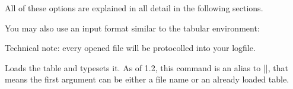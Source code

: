 \documentclass[a4paper]{ltxdoc}
\begin{document}
\begin{command}{\pgfplotstabletypeset{}}
    \noindent All of these options are explained in all detail in the following
    sections.

    You may also use an input format similar to the tabular environment:
\begin{codeexample}[width=8cm]
\end{codeexample}

    Technical note: every opened file will be protocolled into your logfile.
\end{command}

\begin{command}{\pgfplotstabletypesetfile{}}
    Loads the table  and typesets it. As of \PGFPlotstable{}
    1.2, this command is an alias to |\pgfplotstabletypeset|, that means the
    first argument can be either a file name or an already loaded table.
\end{command}
\end{document}
